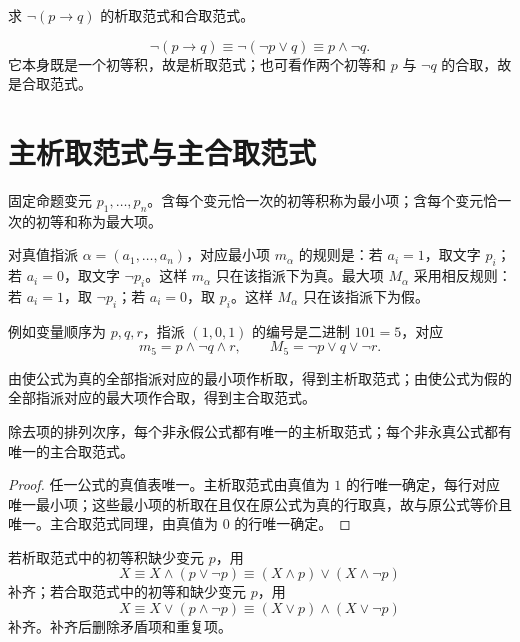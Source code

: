 \begin{example}[title={化为析取范式和合取范式}]\label{ch1-nf-example}
求 $\neg(p\to q)$ 的析取范式和合取范式。
\begin{solution}
\[
\neg(p\to q)\equiv\neg(\neg p\lor q)\equiv p\land\neg q.
\]
它本身既是一个初等积，故是析取范式；也可看作两个初等和 $p$ 与 $\neg q$ 的合取，故是合取范式。
\end{solution}
\end{example}

\section{主析取范式与主合取范式}

\begin{definition}[最小项与最大项]\label{ch1-minmax}
固定命题变元 $p_1,\ldots,p_n$。含每个变元恰一次的初等积称为最小项；含每个变元恰一次的初等和称为最大项。
\end{definition}

对真值指派 $\alpha=(a_1,\ldots,a_n)$，对应最小项 $m_\alpha$ 的规则是：若 $a_i=1$，取文字 $p_i$；若 $a_i=0$，取文字 $\neg p_i$。这样 $m_\alpha$ 只在该指派下为真。最大项 $M_\alpha$ 采用相反规则：若 $a_i=1$，取 $\neg p_i$；若 $a_i=0$，取 $p_i$。这样 $M_\alpha$ 只在该指派下为假。

例如变量顺序为 $p,q,r$，指派 $(1,0,1)$ 的编号是二进制 $101=5$，对应
\[
m_5=p\land\neg q\land r,\qquad
M_5=\neg p\lor q\lor\neg r.
\]

\begin{definition}[主范式]\label{ch1-principal-normal-form}
由使公式为真的全部指派对应的最小项作析取，得到主析取范式；由使公式为假的全部指派对应的最大项作合取，得到主合取范式。
\end{definition}

\begin{theorem}[主范式定理]\label{ch1-principal-theorem}
除去项的排列次序，每个非永假公式都有唯一的主析取范式；每个非永真公式都有唯一的主合取范式。
\end{theorem}
\begin{proof}
任一公式的真值表唯一。主析取范式由真值为 $1$ 的行唯一确定，每行对应唯一最小项；这些最小项的析取在且仅在原公式为真的行取真，故与原公式等价且唯一。主合取范式同理，由真值为 $0$ 的行唯一确定。
\end{proof}

\begin{method}[补项法]\label{ch1-completion-method}
若析取范式中的初等积缺少变元 $p$，用
\[
X\equiv X\land(p\lor\neg p)\equiv(X\land p)\lor(X\land\neg p)
\]
补齐；若合取范式中的初等和缺少变元 $p$，用
\[
X\equiv X\lor(p\land\neg p)\equiv(X\lor p)\land(X\lor\neg p)
\]
补齐。补齐后删除矛盾项和重复项。
\end{method}


